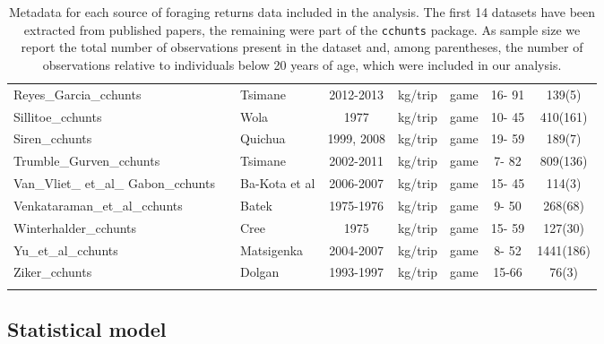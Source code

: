 \begin{landscape}
\begin{longtable}{M{2.6cm} M{3.6cm} M{1.5cm} c c M{1cm} c c}
Reyes\_Garcia\_cchunts          & \cite{reyes-garcia_adaptive_2016}         & Tsimane         & 2012-2013  & kg/trip   & game               & 16- 91  & 139(5)      \\
Sillitoe\_cchunts              & \cite{sillitoe_managing_2004}             & Wola            & 1977       & kg/trip   & game               & 10- 45  & 410(161)    \\
Siren\_cchunts                 & \cite{siren_effects_2016}                 & Quichua         & 1999, 2008 & kg/trip   & game               & 19- 59  & 189(7)      \\
Trumble\_Gurven\_cchunts        & \cite{gurven_how_2006}                    & Tsimane         & 2002-2011  & kg/trip   & game               & 7- 82   & 809(136)    \\
Van\_Vliet\_ et\_al\_ Gabon\_cchunts & \cite{van_vliet_hunting_2008}             & Ba-Kota et al   & 2006-2007  & kg/trip   & game               & 15- 45  & 114(3)      \\
Venkataraman\_et\_al\_cchunts    & \cite{endicott_hunting_1979}              & Batek           & 1975-1976  & kg/trip   & game               & 9- 50   & 268(68)     \\
Winterhalder\_cchunts          & \cite{winterhalder_boreal_1983}           & Cree            & 1975       & kg/trip   & game               & 15- 59  & 127(30)     \\
Yu\_et\_al\_cchunts              & \cite{ohl-schacherer_sustainability_2007} & Matsigenka      & 2004-2007  & kg/trip   & game               & 8- 52   & 1441(186)   \\
Ziker\_cchunts                 & \cite{ziker_peoples_2002}                 & Dolgan          & 1993-1997 & kg/trip   & game               & 15-66  & 76(3)     \\ 
\caption{Metadata for each source of foraging returns data included in the analysis. The first 14 datasets have been extracted from published papers, the remaining were part of the \texttt{cchunts} package. As sample size we report the total number of observations present in the dataset and, among parentheses, the number of observations relative to individuals below 20 years of age, which were included in our analysis. }
\label{tab:metadata}
\end{longtable}
\end{landscape}

\subsection{Statistical model}\label{SI:model}


